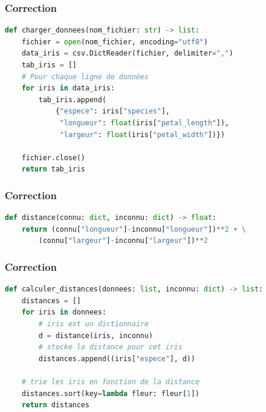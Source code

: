 \documentclass[svgnames,11pt]{beamer}
\begin{document}
\begin{frame}[fragile]
    \frametitle{Correction}
    \begin{center}
        \begin{lstlisting}[language=Python , basicstyle=\ttfamily\small, xleftmargin=0.2em, xrightmargin=-2em]
def charger_donnees(nom_fichier: str) -> list:
    fichier = open(nom_fichier, encoding="utf8")
    data_iris = csv.DictReader(fichier, delimiter=",")
    tab_iris = []
    # Pour chaque ligne de données
    for iris in data_iris:
        tab_iris.append(
            {"espece": iris["species"],
             "longueur": float(iris["petal_length"]),
             "largeur": float(iris["petal_width"])})

    fichier.close()
    return tab_iris
\end{lstlisting}
    \end{center}

\end{frame}
\begin{frame}[fragile]
    \frametitle{Correction}
    \begin{center}
        \begin{lstlisting}[language=Python , basicstyle=\ttfamily\small, xleftmargin=0.2em, xrightmargin=-3em]
def distance(connu: dict, inconnu: dict) -> float:
    return (connu["longueur"]-inconnu["longueur"])**2 + \
        (connu["largeur"]-inconnu["largeur"])**2
\end{lstlisting}
    \end{center}

\end{frame}
\begin{frame}[fragile]
    \frametitle{Correction}

    \begin{center}
        \begin{lstlisting}[language=Python , basicstyle=\ttfamily\small, xleftmargin=0.2em, xrightmargin=-2em]
def calculer_distances(donnees: list, inconnu: dict) -> list:
    distances = []
    for iris in donnees:
        # iris est un dictionnaire
        d = distance(iris, inconnu)
        # stocke la distance pour cet iris
        distances.append((iris["espece"], d))

    # trie les iris en fonction de la distance
    distances.sort(key=lambda fleur: fleur[1])
    return distances
\end{lstlisting}
    \end{center}

\end{frame}
\end{document}

